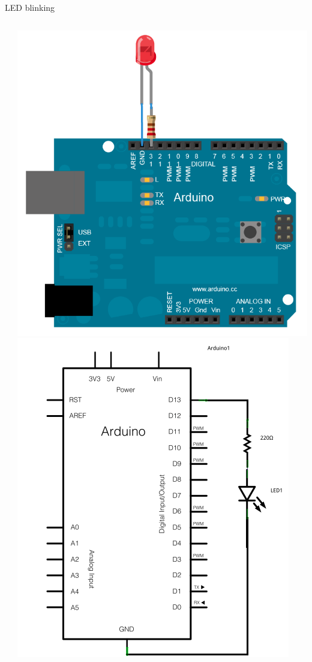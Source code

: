 \documentclass[compress]{beamer}
\begin{document}
\begin{frame}[fragile]{LED blinking}
\begin{columns}
\begin{column}{0.7\linewidth}
        \end{column}
        \begin{column}{0.3\linewidth}
            \begin{center}
                \includegraphics[width=0.35\paperheight]{arduino-led}
                \includegraphics[width=0.3\paperheight]{arduino-led-schematic}
            \end{center}
        \end{column}
    \end{columns}
\end{frame}
\end{document}
